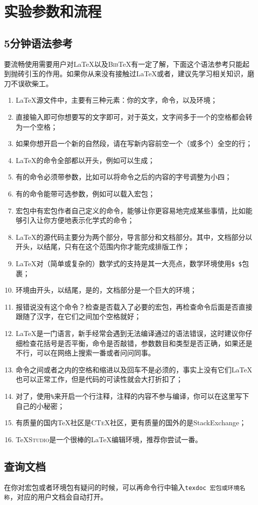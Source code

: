 \chapter{实验参数和流程}
\section{5分钟语法参考}

{\kaishu 要流畅使用\cquthesis 需要用户对\LaTeX 以及\textsc{Bib}\TeX 有一定了解，下面这个语法参考只能起到抛砖引玉的作用。如果你从来没有接触过\LaTeX 或者\XeTeX ，建议先学习相关知识，磨刀不误砍柴工。}
\medskip
\begin{enumerate}
	\item \LaTeX 源文件中，主要有三种元素：你的文字，命令，以及环境；
	\item 直接输入即可你想要写的文字即可，对于英文，文字间多于一个的空格都会转为一个空格；
	\item 如果你想开启一个新的自然段，请在写新内容前空一个（或多个）全空的行；
	\item \LaTeX 的命令{\heiti 全部}都以\cs{ }开头，例如可以生成\XeTeX ；
	\item 有的命令{\heiti 必须}带参数，比如可以将命令之后的内容的字号调整为小四；
	\item 有的命令能带可选参数，例如可以载入宏包；
	\item 宏包中有宏包作者自己定义的命令，能够让你更容易地完成某些事情，比如能够引入让你方便地表示化学式的命令；
	\item \LaTeX 的源代码主要分为两个部分，导言部分和文档部分。其中，文档部分以开头，以结尾，只有在这个范围内你才能完成排版工作；
	\item \LaTeX 对（简单或复杂的）数学式的支持是其一大亮点，数学环境使用\texttt{\${ }\$}包裹；
	\item 环境由开头，以结尾，是的，文档部分是一个巨大的环境；
	\item 报错说没有这个命令？检查是否载入了必要的宏包，再检查命令后面是否直接跟随了汉字，在它们之间加个空格就好；
	\item \LaTeX 是一门语言，新手经常会遇到无法编译通过的语法错误，这时建议你仔细检查花括号是否平衡，命令是否敲错，参数数目和类型是否正确，如果还是不行，可以在网络上搜索一番或者问问同事。
	\item 命令之间或者之内的空格和缩进以及回车不是必须的，事实上没有它们\LaTeX 也可以正常工作，但是代码的可读性就会大打折扣了；
	\item 对了，使用\texttt{\%}来开启一个行注释，注释的内容不参与编译，你可以在这里写下自己的小秘密；
	\item 有质量的国内\TeX 社区是\textsc{CTeX}社区，更有质量的国外的是\textsf{StackExchange}；
	\item \TeX\textsc{Studio}是一个很棒的\LaTeX 编辑环境，推荐你尝试一番。
\end{enumerate}

\section{查询文档}
在你对宏包或者环境包有疑问的时候，可以再命令行中输入\texttt{texdoc 宏包或环境名称}，对应的用户文档会自动打开。





